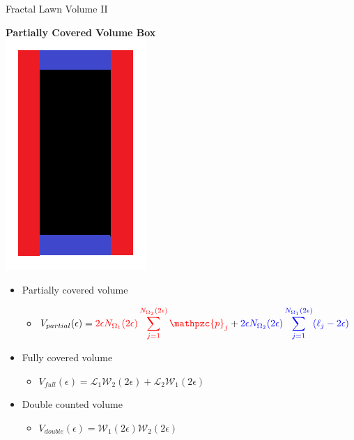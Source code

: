 \documentclass{if-beamer}
\newcommand{\SL}{\mathcal{L}}
\newcommand{\Om}{\Omega}
\newcommand{\W}{\mathcal{W}}
\newcommand{\p}{\mathpzc{p}}
\begin{document}
\begin{frame}{Fractal Lawn Volume II}
	\begin{center}
		{\bf Partially Covered Volume Box} \\
		\includegraphics[scale=0.25]{VolumeBox.png}
	\end{center}
	\pause
	\vspace{0.2in}
	
	\begin{itemize}
		\item Partially covered volume
		\begin{itemize}
			\item $\displaystyle V_{partial}(\epsilon)=\textcolor{red}{2\epsilon N_{\Om_1}(2\epsilon)\sum_{j=1}^{N_{\Om_2}(2\epsilon)} \p_j} + \textcolor{blue}{2\epsilon N_{\Om_2}(2\epsilon)\sum_{j=1}^{N_{\Om_1}(2\epsilon)} (\ell_j - 2\epsilon)}$
		\end{itemize}
		\pause
		
		\item Fully covered volume
		\begin{itemize}
			\item $\displaystyle V_{full}(\epsilon)=\SL_1 \W_2(2\epsilon) + \SL_2 \W_1(2\epsilon)$
		\end{itemize}
		\pause
		
		\item Double counted volume
		\begin{itemize}
			\item $V_{double}(\epsilon)=\W_1(2\epsilon) \W_2(2\epsilon)$
		\end{itemize}
	\end{itemize}
	
\end{frame}
\end{document}

